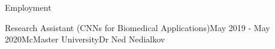 \begin{rSection}{Employment}
\begin{rSubsection}{Research Assistant (CNNs for Biomedical Applications)}{May 2019 - May 2020}{McMaster University}{Dr Ned Nedialkov}
\end{rSubsection}



\end{rSection}